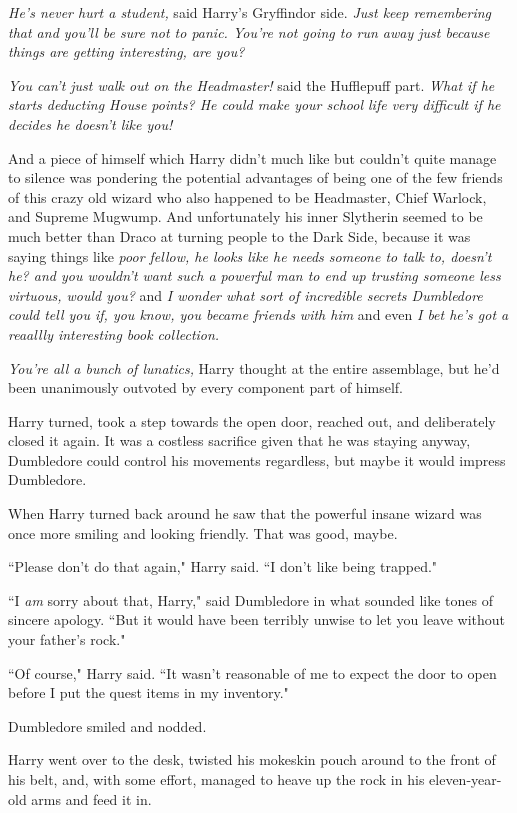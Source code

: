 \emph{He's never hurt a student,} said Harry's Gryffindor side. \emph{Just keep remembering that and you'll be sure not to panic. You're not going to run away just because things are getting interesting, are you?}

\emph{You can't just walk out on the Headmaster!} said the Hufflepuff part. \emph{What if he starts deducting House points? He could make your school life very difficult if he decides he doesn't like you!}

And a piece of himself which Harry didn't much like but couldn't quite manage to silence was pondering the potential advantages of being one of the few friends of this crazy old wizard who also happened to be Headmaster, Chief Warlock, and Supreme Mugwump. And unfortunately his inner Slytherin seemed to be much better than Draco at turning people to the Dark Side, because it was saying things like \emph{poor fellow, he looks like he needs someone to talk to, doesn't he? \emph{and} you wouldn't want such a powerful man to end up trusting someone less virtuous, would you?} and \emph{I wonder what sort of incredible secrets Dumbledore could tell you if, you know, you became friends with him} and even \emph{I bet he's got a reaallly interesting book collection.}

\emph{You're all a bunch of lunatics,} Harry thought at the entire assemblage, but he'd been unanimously outvoted by every component part of himself.

Harry turned, took a step towards the open door, reached out, and deliberately closed it again. It was a costless sacrifice given that he was staying anyway, Dumbledore could control his movements regardless, but maybe it would impress Dumbledore.

When Harry turned back around he saw that the powerful insane wizard was once more smiling and looking friendly. That was good, maybe.

``Please don't do that again," Harry said. ``I don't like being trapped."

``I \emph{am} sorry about that, Harry," said Dumbledore in what sounded like tones of sincere apology. ``But it would have been terribly unwise to let you leave without your father's rock."

``Of course," Harry said. ``It wasn't reasonable of me to expect the door to open before I put the quest items in my inventory."

Dumbledore smiled and nodded.

Harry went over to the desk, twisted his mokeskin pouch around to the front of his belt, and, with some effort, managed to heave up the rock in his eleven-year-old arms and feed it in.

